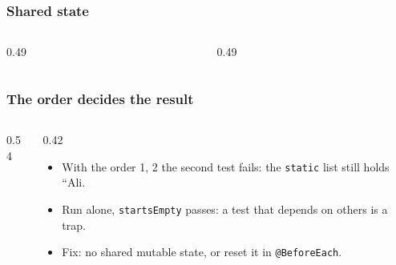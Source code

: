 \documentclass[aspectratio=169,10pt,compress]{beamer}
\begin{document}
\begin{frame}[t,fragile] \frametitle{Shared state}
  \begin{columns}[T]
    \begin{column}{0.49\textwidth}
    \end{column}
    \begin{column}{0.49\textwidth}
    \end{column}
  \end{columns}
\end{frame}




\begin{frame}[t,fragile] \frametitle{The order decides the result}
  \begin{columns}[T]
    \begin{column}{0.54\textwidth}
    \end{column}
    \begin{column}{0.42\textwidth}
      \begin{itemize}\small
        \item With the order 1, 2 the second test fails: the \texttt{static} list still holds ``Ali.
        \item Run alone, \texttt{startsEmpty} passes: a test that depends on others is a trap.
        \item Fix: no shared mutable state, or reset it in \texttt{@BeforeEach}.
      \end{itemize}
    \end{column}
  \end{columns}
\end{frame}

\end{document}
